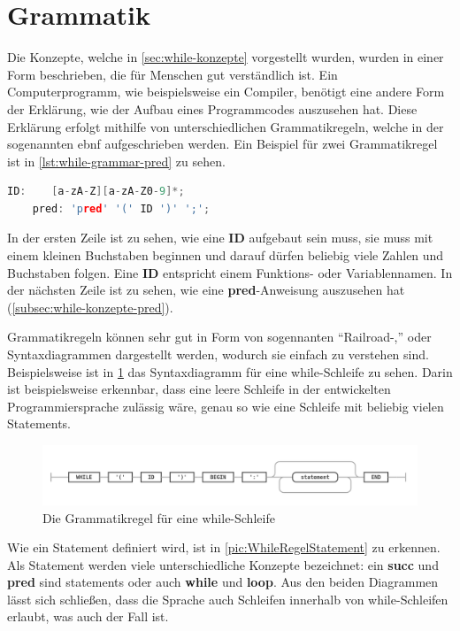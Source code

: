 \section{Grammatik} \label{sec:while-grammar}
Die Konzepte, welche in \cref{sec:while-konzepte} vorgestellt wurden, wurden in einer Form beschrieben, die für Menschen gut verständlich ist. Ein Computerprogramm, wie beispielsweise ein Compiler, benötigt eine andere Form der Erklärung, wie der Aufbau eines Programmcodes auszusehen hat. Diese Erklärung erfolgt mithilfe von unterschiedlichen  Grammatikregeln, welche in der sogenannten \ac{ebnf} aufgeschrieben werden. Ein Beispiel für zwei Grammatikregel ist in \cref{lst:while-grammar-pred} zu sehen.

\begin{lstlisting}[language=c, caption=Zwei einfache Grammatikregel, label={lst:while-grammar-pred}]
	ID:    [a-zA-Z][a-zA-Z0-9]*;
	pred: 'pred' '(' ID ')' ';';
\end{lstlisting}

In der ersten Zeile ist zu sehen, wie eine \textbf{ID} aufgebaut sein muss, sie muss mit einem kleinen Buchstaben beginnen und darauf dürfen beliebig viele Zahlen und Buchstaben folgen. Eine \textbf{ID} entspricht einem Funktions- oder Variablennamen.  In der nächsten Zeile ist zu sehen, wie eine \textbf{pred}-Anweisung auszusehen hat (\cref{subsec:while-konzepte-pred}).

Grammatikregeln können sehr gut in Form von sogennanten \enquote{Railroad-,} oder {Syntaxdiagrammen} dargestellt werden, wodurch sie einfach zu verstehen sind. Beispielsweise ist in \cref{pic:WhileRegelWhile} das Syntaxdiagramm für eine while-Schleife zu sehen. Darin ist beispielsweise erkennbar, dass eine leere Schleife in der entwickelten Programmiersprache zulässig wäre, genau so wie eine Schleife mit beliebig vielen Statements.

\begin{figure}[h!]
	\centering
	\includegraphics[width=14cm]{content/pictures/while.png}
	\caption{Die Grammatikregel für eine while-Schleife}
	\label{pic:WhileRegelWhile}
\end{figure}

Wie ein Statement definiert wird, ist in \cref{pic:WhileRegelStatement} zu erkennen. Als Statement werden viele unterschiedliche Konzepte bezeichnet: ein \textbf{succ} und \textbf{pred} sind statements oder auch \textbf{while} und \textbf{loop}. Aus den beiden Diagrammen lässt sich schließen, dass die Sprache auch Schleifen innerhalb von while-Schleifen erlaubt, was auch der Fall ist. 

